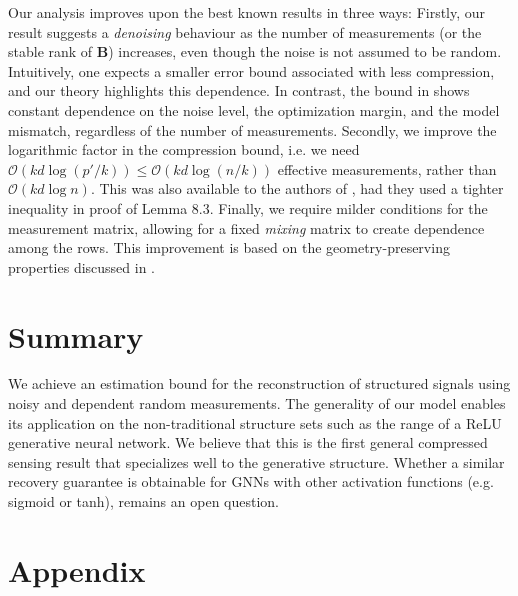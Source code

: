 \documentclass{article}
\begin{document}
\par
Our analysis improves upon the best known results in three ways: Firstly, our result suggests a \textit{denoising} behaviour as the number of measurements (or the stable rank of $\mathbf{B}$) increases, even though the noise is not assumed to be random. Intuitively, one expects a smaller error bound associated with less compression, and our theory highlights this dependence. In contrast, the bound in \cite{bora2017compressed} shows constant dependence on the noise level, the optimization margin, and the model mismatch, regardless of the number of measurements. Secondly, we improve the logarithmic factor in the compression bound, i.e. we need $\mathcal{O}(kd \log(p'/k)) \leq \mathcal{O}(kd \log(n/k))$ effective measurements, rather than $\mathcal{O}(kd \log n)$. This was also available to the authors of \cite{bora2017compressed}, had they used a tighter inequality in proof of Lemma 8.3. Finally, we require milder conditions for the measurement matrix, allowing for a fixed \textit{mixing} matrix to create dependence among the rows. This improvement is based on the geometry-preserving properties discussed in \cite{jeong2020subgaussian}.





\section{Summary} \label{conclude}
\par
We achieve an estimation bound for the reconstruction of structured signals using noisy and dependent random measurements. The generality of our model enables its application on the non-traditional structure sets such as the range of a ReLU generative neural network. We believe that this is the first general compressed sensing result that specializes well to the generative structure. Whether a similar recovery guarantee is obtainable for GNNs with other activation functions (e.g. sigmoid or tanh), remains an open question.



\newpage
\printbibliography

\newpage
\appendix
\section{Appendix}
\end{document}
